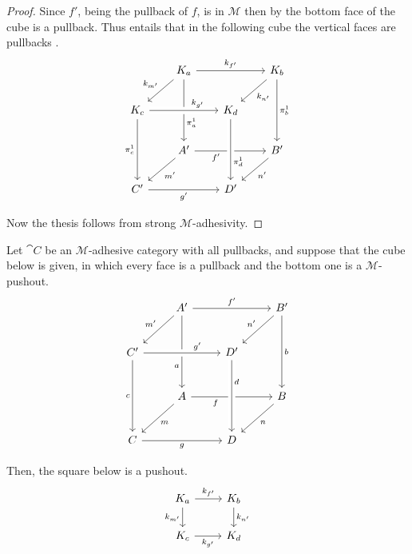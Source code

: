 \begin{proof}
	Since $f'$, being the pullback of $f$, is in $\mathcal{M}$ then by   the bottom face of the cube is a pullback. Thus  entails that in the following cube the vertical faces are pullbacks .
	\[\begin{tikzcd}[row sep = 20, column sep = 20]
		& {K_a} && {K_b} \\
		{K_c} && {K_d} \\
		& {A'} && {B'} \\
		{C'} && {D'}
		\arrow["{k_{f'}}", from=1-2, to=1-4]
		\arrow["{k_{m'}}"', from=1-2, to=2-1]
		\arrow["{\pi_a^1}"{pos=0.7}, from=1-2, to=3-2]
		\arrow["{k_{n'}}", from=1-4, to=2-3]
		\arrow["{\pi_b^1}", from=1-4, to=3-4]
		\arrow["{k_{g'}}"{pos=0.7}, from=2-1, to=2-3, crossing over]
		\arrow["{\pi_c^1}"', from=2-1, to=4-1]
		\arrow["{f'}"'{pos=0.3}, from=3-2, to=3-4]
		\arrow["{\pi_d^1}"{pos=0.7}, from=2-3, to=4-3, crossing over]
		\arrow["{m'}", from=3-2, to=4-1]
		\arrow["{n'}", from=3-4, to=4-3]
		\arrow["{g'}"', from=4-1, to=4-3]
	\end{tikzcd}\]
	
Now the thesis follows from strong $\mathcal{M}$-adhesivity.
\end{proof}


\color{black}

\begin{lemma}\label{lemma:pushouts_kernel_pairs}
    Let $\cat C$ be an  $\mathcal{M}$-adhesive category with all pullbacks, and suppose that the cube below is given, in which every face is a pullback and the bottom one is a $\mathcal{M}$-pushout.
        \[\begin{tikzcd}[row sep=25, column sep=25]
	& {A'} && {B'} \\
	{C'} && {D'} \\
	& A && B \\
	C && D
	\arrow["{f'}", from=1-2, to=1-4]
	\arrow["{m'}"', from=1-2, to=2-1]
	\arrow["a"'{pos=0.7}, from=1-2, to=3-2]
	\arrow["{n'}"', from=1-4, to=2-3]
	\arrow["b", from=1-4, to=3-4]
	\arrow["{g'}"{pos=0.7}, from=2-1, to=2-3, crossing over]
	\arrow["c"', from=2-1, to=4-1]
	\arrow["f"'{pos=0.3}, from=3-2, to=3-4]
	\arrow["d"{pos=0.3}, from=2-3, to=4-3, crossing over]
	\arrow["m", from=3-2, to=4-1]
	\arrow["n", from=3-4, to=4-3]
	\arrow["g"', from=4-1, to=4-3]
    \end{tikzcd}\]
    
    Then, the square below is a pushout.
    \[
        \begin{tikzcd}%
            {K_a} \ar[r, "{k_{f'}}"] \ar[d, "{k_{m'}}"'] & {K_b} \ar[d, "{k_{n'}}"] \\
            {K_c} \ar[r, "{k_{g'}}"'] & {K_d}
        \end{tikzcd}
    \]
\end{lemma}

